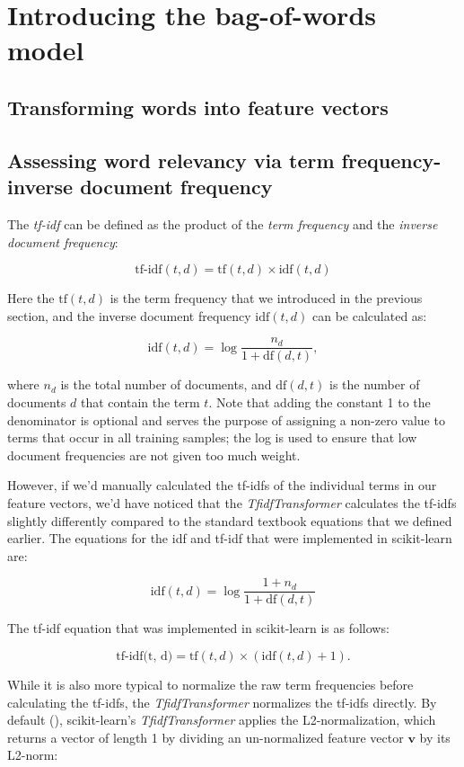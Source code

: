 \documentclass[letterpaper]{report}
\begin{document}
\section{Introducing the bag-of-words model}
\subsection{Transforming words into feature vectors}
\subsection{Assessing word relevancy via term frequency-inverse document frequency}

The \textit{tf-idf} can be defined as the product of the \textit{term frequency} and the \textit{inverse document frequency}:

\[
\text{tf-idf}(t, d) = \text{tf} (t, d) \times \text{idf}(t, d)
\]

Here the $\text{tf}(t, d)$ is the term frequency that we introduced in the previous section,
and the inverse document frequency $\text{idf}(t, d)$ can be calculated as:

\[
\text{idf}(t, d) = \log \frac{n_d}{1 + \text{df}(d, t)},
\]

where $n_d$ is the total number of documents, and $\text{df}(d, t)$  is the number of documents $d$ that contain the term $t$. Note that adding the constant 1 to the denominator is optional and serves the purpose of assigning a non-zero value to terms that occur in all training samples; the log is used to ensure that low document frequencies are not given too much weight.

However, if we'd manually calculated the tf-idfs of the individual terms in our feature vectors, we'd have noticed that the \textit{TfidfTransformer} calculates the tf-idfs slightly differently compared to the standard textbook equations that we defined earlier. The equations for the idf and tf-idf that were implemented in scikit-learn are:

\[
\text{idf}(t, d) = \log \frac{1 + n_d}{1 + \text{df}(d, t)}
\]

The tf-idf equation that was implemented in scikit-learn is as follows:

\[
\text{tf-idf(t, d)} = \text{tf}(t, d) \times (\text{idf} (t, d) + 1).
\]

While it is also more typical to normalize the raw term frequencies before calculating the tf-idfs, the \textit{TfidfTransformer} normalizes the tf-idfs directly. By default (), scikit-learn's \textit{TfidfTransformer} applies the L2-normalization, which returns a vector of length 1 by dividing an un-normalized feature vector $\mathbf{v}$ by its L2-norm:
\end{document}
